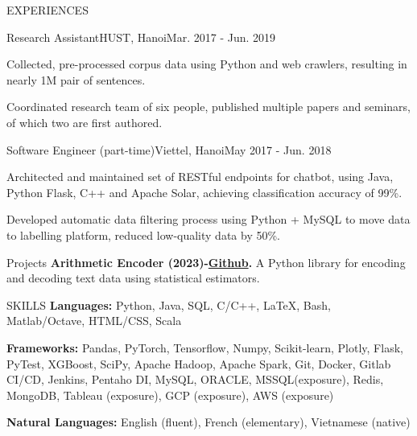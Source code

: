\documentclass{resume} %
\begin{document}
\begin{rSection}{EXPERIENCES}
\begin{rWork}{Research Assistant}{HUST, Hanoi}{Mar. 2017 - Jun. 2019}
    \item Collected, pre-processed corpus data using Python and web crawlers, resulting in nearly 1M pair of sentences.
    \item Coordinated research team of six people, published multiple papers and seminars, of which two are first authored.
  \end{rWork}
  \begin{rWork}{Software Engineer (part-time)}{Viettel, Hanoi}{May 2017 - Jun. 2018}
    \item Architected and maintained set of RESTful endpoints for chatbot, using Java, Python Flask, C++ and Apache Solar, achieving classification accuracy of 99\%.
    \item Developed automatic data filtering process using Python + MySQL to move data to labelling platform, reduced low-quality data by 50\%.
  \end{rWork}
\end{rSection}
\begin{rSection}{Projects}
\textbf{Arithmetic Encoder (2023)-\href{https://github.com/HongHaiPV/ArithmeticEncoder}{Github}.} A Python library for encoding and decoding text data using statistical estimators.
\end{rSection}
\begin{rSection}{SKILLS}
\textbf{Languages:} Python, Java, SQL, C/C++, \LaTeX, Bash, Matlab/Octave, HTML/CSS, Scala

\textbf{Frameworks:} Pandas, PyTorch, Tensorflow, Numpy, Scikit-learn, Plotly, Flask, PyTest, XGBoost, SciPy, Apache Hadoop, Apache Spark, Git, Docker, Gitlab CI/CD, Jenkins, Pentaho DI, MySQL, ORACLE, MSSQL(exposure), Redis, MongoDB, Tableau (exposure), GCP (exposure), AWS (exposure)

\textbf{Natural Languages:} English (fluent), French (elementary), Vietnamese (native)

\end{rSection}
\end{document}
